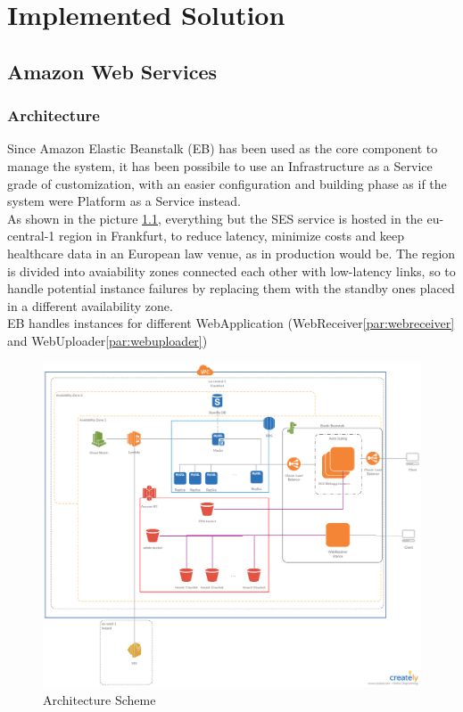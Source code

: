 \chapter{Implemented Solution}
\section{Amazon Web Services}

\subsection{Architecture}
Since Amazon Elastic Beanstalk (EB) has been used as the core component to manage the system, it has been possibile to use an Infrastructure as a Service grade of customization, with an easier configuration and building phase as if the system were Platform as a Service instead.\\
As shown in the picture \ref{fig:architecture}, everything but the SES service is hosted in the eu-central-1 region in Frankfurt, to reduce latency, minimize costs and keep healthcare data in an European law venue, as in production would be.
The region is divided into avaiability zones connected each other with low-latency links, so to handle potential instance failures by replacing them with the standby ones placed in a different availability zone.\\
EB handles instances for different WebApplication (WebReceiver\ref{par:webreceiver} and WebUploader\ref{par:webuploader})

\begin{figure}[h]
    \includegraphics[width=\textwidth]{architecture}
    \caption{Architecture Scheme}
    \label{fig:architecture}
\end{figure}
